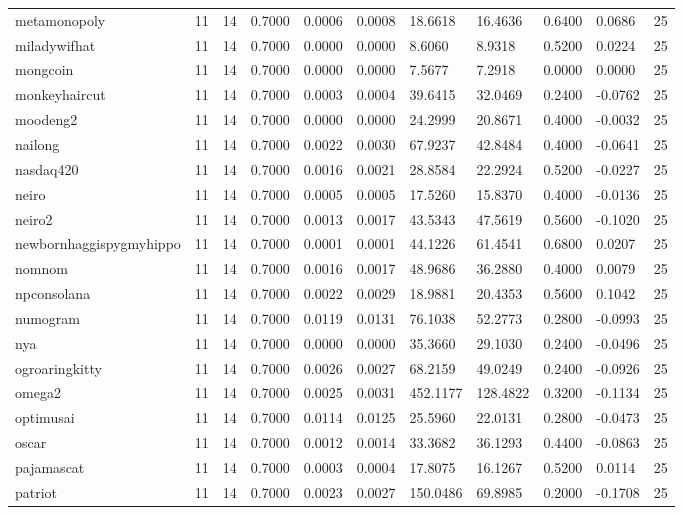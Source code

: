 \begin{table}[htbp]
\begin{tabular}{lllllllllll}
metamonopoly & 11 & 14 & 0.7000 & 0.0006 & 0.0008 & 18.6618 & 16.4636 & 0.6400 & 0.0686 & 25 \\
miladywifhat & 11 & 14 & 0.7000 & 0.0000 & 0.0000 & 8.6060 & 8.9318 & 0.5200 & 0.0224 & 25 \\
mongcoin & 11 & 14 & 0.7000 & 0.0000 & 0.0000 & 7.5677 & 7.2918 & 0.0000 & 0.0000 & 25 \\
monkeyhaircut & 11 & 14 & 0.7000 & 0.0003 & 0.0004 & 39.6415 & 32.0469 & 0.2400 & -0.0762 & 25 \\
moodeng2 & 11 & 14 & 0.7000 & 0.0000 & 0.0000 & 24.2999 & 20.8671 & 0.4000 & -0.0032 & 25 \\
nailong & 11 & 14 & 0.7000 & 0.0022 & 0.0030 & 67.9237 & 42.8484 & 0.4000 & -0.0641 & 25 \\
nasdaq420 & 11 & 14 & 0.7000 & 0.0016 & 0.0021 & 28.8584 & 22.2924 & 0.5200 & -0.0227 & 25 \\
neiro & 11 & 14 & 0.7000 & 0.0005 & 0.0005 & 17.5260 & 15.8370 & 0.4000 & -0.0136 & 25 \\
neiro2 & 11 & 14 & 0.7000 & 0.0013 & 0.0017 & 43.5343 & 47.5619 & 0.5600 & -0.1020 & 25 \\
newbornhaggispygmyhippo & 11 & 14 & 0.7000 & 0.0001 & 0.0001 & 44.1226 & 61.4541 & 0.6800 & 0.0207 & 25 \\
nomnom & 11 & 14 & 0.7000 & 0.0016 & 0.0017 & 48.9686 & 36.2880 & 0.4000 & 0.0079 & 25 \\
npconsolana & 11 & 14 & 0.7000 & 0.0022 & 0.0029 & 18.9881 & 20.4353 & 0.5600 & 0.1042 & 25 \\
numogram & 11 & 14 & 0.7000 & 0.0119 & 0.0131 & 76.1038 & 52.2773 & 0.2800 & -0.0993 & 25 \\
nya & 11 & 14 & 0.7000 & 0.0000 & 0.0000 & 35.3660 & 29.1030 & 0.2400 & -0.0496 & 25 \\
ogroaringkitty & 11 & 14 & 0.7000 & 0.0026 & 0.0027 & 68.2159 & 49.0249 & 0.2400 & -0.0926 & 25 \\
omega2 & 11 & 14 & 0.7000 & 0.0025 & 0.0031 & 452.1177 & 128.4822 & 0.3200 & -0.1134 & 25 \\
optimusai & 11 & 14 & 0.7000 & 0.0114 & 0.0125 & 25.5960 & 22.0131 & 0.2800 & -0.0473 & 25 \\
oscar & 11 & 14 & 0.7000 & 0.0012 & 0.0014 & 33.3682 & 36.1293 & 0.4400 & -0.0863 & 25 \\
pajamascat & 11 & 14 & 0.7000 & 0.0003 & 0.0004 & 17.8075 & 16.1267 & 0.5200 & 0.0114 & 25 \\
patriot & 11 & 14 & 0.7000 & 0.0023 & 0.0027 & 150.0486 & 69.8985 & 0.2000 & -0.1708 & 25 \\

\end{tabular}
\end{table}
